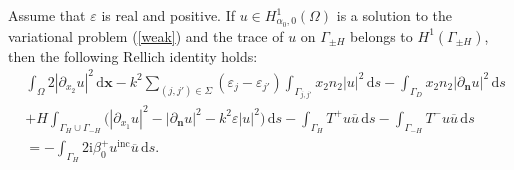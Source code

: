 \documentclass[a4paper,10pt]{article}
\newcommand{\bx}{{\mathbf x}}
\newcommand{\bn}{{\mathbf n}}
\newcommand{\ri}{{\mathrm i}}
\newcommand{\rd}{{\,\mathrm d}}
\newcommand{\inc}{{\mathrm{inc}}}
\newcommand{\dn}{{\partial_\bn}}
\newcommand{\dxo}{{\partial_{x_1}}}
\newcommand{\dxt}{{\partial_{x_2}}}
\newcommand{\cu}{{\overline{u}}}
\newcommand{\GD}{{\Gamma_D}}
\newcommand{\GH}{{\Gamma_H}}
\newcommand{\GmH}{{\Gamma_{-H}}}
\newcommand{\GpmH}{{\Gamma_{\pm H}}}
\begin{document}
\begin{lem} \label{RelLem}
Assume that $\varepsilon$ is real and positive. 
If $u\in H^1_{\alpha_0,0}(\Omega)$ is a solution to the variational problem (\ref{weak}) and the trace of $u$ on $\GpmH$ belongs to $H^1(\GpmH)$, then the following Rellich identity holds:
\begin{align} \nonumber
	& \int_\Omega 2 \left| \dxt u \right|^2 \rd\bx
	-  k^2\sum_{(j,j')\in\Sigma} ( \varepsilon_{j} -\varepsilon_{j'} ) \int_{\Gamma_{j,j'}} x_2 n_2 |u|^2\rd s
	- \int_{\GD} x_2n_2|\dn u|^2 \rd s\\
	&+ H \int_{\GH\cup\GmH} \biggl( \left|\dxo u \right|^2 - \left| \dn u \right|^2 -k^2\varepsilon |u|^2 \biggr)\rd s
	-\int_{\GH} T^+ u \cu\rd s -\int_\GmH T^- u \cu \rd s
	\nonumber \\
	& = -\int_{\GH} 2 \ri \beta_0^+ u^\inc \cu \rd s.
	\label{rellich}
\end{align}
\end{lem}
\end{document}
